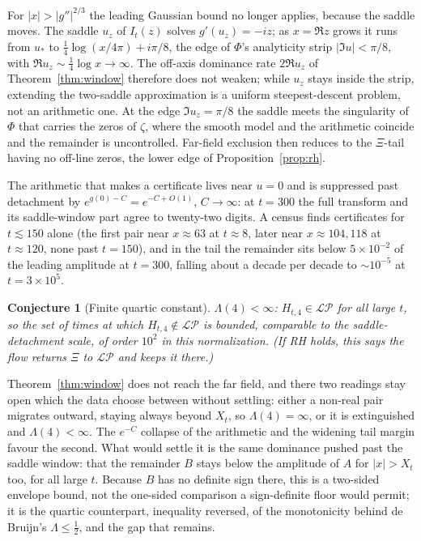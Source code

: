 \documentclass[11pt,reqno]{amsart}
\theoremstyle{plain}
\newtheorem{conjecture}[theorem]{Conjecture}
\theoremstyle{definition}
\theoremstyle{remark}
\newcommand{\LP}{\mathcal{LP}}
\begin{document}
For $|x|>|g''|^{2/3}$ the leading Gaussian bound no longer applies, because the
saddle moves. The saddle $u_z$ of $I_t(z)$ solves $g'(u_z)=-iz$; as $x=\Re z$
grows it runs from $u_*$ to $\tfrac14\log(x/4\pi)+i\pi/8$, the edge of $\Phi$'s
analyticity strip $|\Im u|<\pi/8$, with $\Re u_z\sim\tfrac14\log x\to\infty$. The
off-axis dominance rate $2\Re u_z$ of Theorem~\ref{thm:window} therefore does not
weaken; while $u_z$ stays inside the strip, extending the two-saddle approximation
is a uniform steepest-descent problem, not an arithmetic one. At the edge
$\Im u_z=\pi/8$ the saddle meets the singularity of $\Phi$ that carries the zeros
of $\zeta$, where the smooth model and the arithmetic coincide and the remainder
is uncontrolled. Far-field exclusion then reduces to the $\Xi$-tail having no
off-line zeros, the lower edge of Proposition~\ref{prop:rh}.

The arithmetic that makes a certificate lives near $u=0$ and is suppressed past
detachment by $e^{g(0)-C}=e^{-C+O(1)}$, $C\to\infty$: at $t=300$ the full transform
and its saddle-window part agree to twenty-two digits. A census finds certificates
for $t\lesssim150$ alone (the first pair near $x\approx63$ at $t\approx8$, later
near $x\approx104,118$ at $t\approx120$, none past $t=150$), and in the tail the
remainder sits below $5\times10^{-2}$ of the leading amplitude at $t=300$, falling
about a decade per decade to $\sim10^{-5}$ at $t=3\times10^5$.

\begin{conjecture}[Finite quartic constant]\label{conj:finite}
$\Lambda(4)<\infty$: $H_{t,4}\in\LP$ for all large $t$, so the set of times at
which $H_{t,4}\notin\LP$ is bounded, comparable to the saddle-detachment scale,
of order $10^2$ in this normalization. (If RH holds, this says the flow
returns $\Xi$ to $\LP$ and keeps it there.)
\end{conjecture}

Theorem~\ref{thm:window} does not reach the far field, and there two readings
stay open which the data choose between without settling: either a non-real pair
migrates outward, staying always beyond $X_t$, so $\Lambda(4)=\infty$, or it is
extinguished and $\Lambda(4)<\infty$. The $e^{-C}$ collapse of the arithmetic and
the widening tail margin favour the second. What would settle it is the same
dominance pushed past the saddle window: that the remainder $B$ stays below the
amplitude of $A$ for $|x|>X_t$ too, for all large $t$. Because $B$ has no definite
sign there, this is a two-sided envelope bound, not the one-sided comparison a
sign-definite floor would permit; it is the quartic counterpart, inequality
reversed, of the monotonicity behind de Bruijn's $\Lambda\le\tfrac12$, and the
gap that remains.
\end{document}
